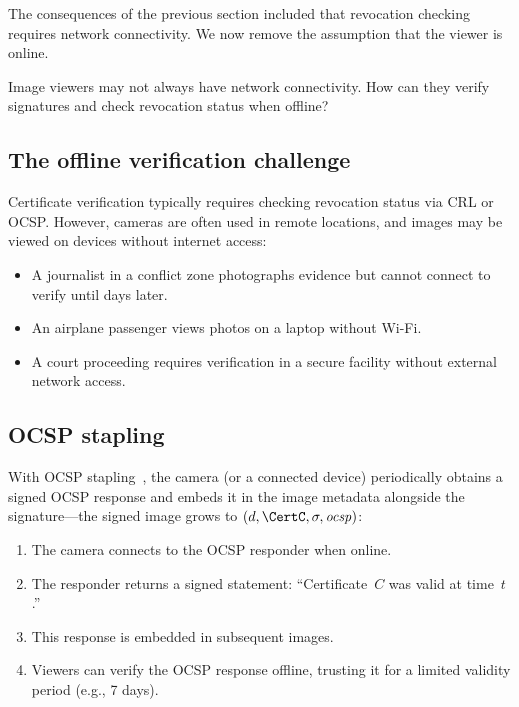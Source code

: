 
The consequences of the previous section included that revocation checking
requires network connectivity.
We now remove the assumption that the viewer is online.

\begin{exercise}
  Image viewers may not always have network connectivity.
  How can they verify signatures and check revocation status when offline?
\end{exercise}

\subsection{The offline verification challenge}

Certificate verification typically requires checking revocation status via CRL
or OCSP\@.
However, cameras are often used in remote locations, and images may be viewed on
devices without internet access:
\begin{itemize}
  \item A journalist in a conflict zone photographs evidence but cannot connect
    to verify until days later.
  \item An airplane passenger views photos on a laptop without Wi-Fi.
  \item A court proceeding requires verification in a secure facility without
    external network access.
\end{itemize}

\subsection{OCSP stapling}

With OCSP stapling~\autocite{RFC6066}, the camera (or a connected device)
periodically obtains a signed OCSP response and embeds it in the image
metadata alongside the signature---the signed image grows to
\((d, \CertC, \sigma, \mathit{ocsp})\):
\begin{enumerate}
  \item The camera connects to the OCSP responder when online.
  \item The responder returns a signed statement: \enquote{Certificate~\(C\) was
    valid at time~\(t\).}
  \item This response is embedded in subsequent images.
  \item Viewers can verify the OCSP response offline, trusting it for a limited
    validity period (e.g., 7 days).
\end{enumerate}

